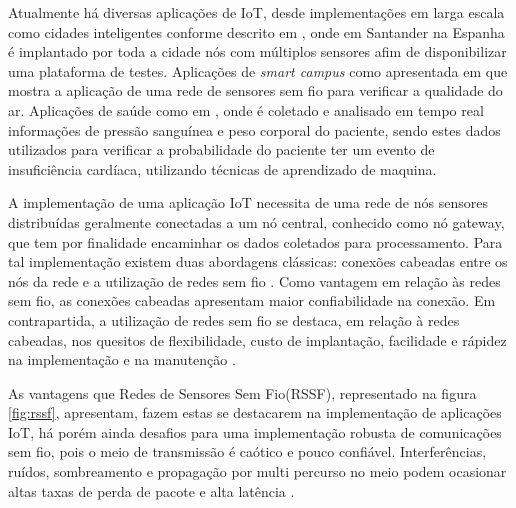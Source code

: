 Atualmente há diversas aplicações de IoT, desde implementações em larga escala como cidades inteligentes conforme descrito em \cite{sotres2017practical}, onde em Santander na Espanha é implantado por toda a cidade nós com múltiplos sensores afim de disponibilizar uma plataforma de testes. Aplicações de \emph{smart campus} como apresentada em \cite{wang2017performance} que mostra a aplicação de uma rede de sensores sem fio para verificar a qualidade do ar. Aplicações de saúde como em \cite{zhang2015remote}, onde é coletado e analisado em tempo real informações de pressão sanguínea e peso corporal do paciente, sendo estes dados utilizados para verificar a probabilidade do paciente ter um evento de insuficiência cardíaca, utilizando técnicas de aprendizado de maquina.


A implementação de uma aplicação IoT necessita de uma rede de nós sensores distribuídas geralmente conectadas a um nó central, conhecido como nó gateway, que tem por finalidade encaminhar os dados coletados para processamento. Para tal implementação existem duas abordagens clássicas: conexões cabeadas entre os nós da rede e a utilização de redes sem fio \cite{gomes2017estimaccao}. Como vantagem em relação às redes sem fio, as conexões cabeadas apresentam maior confiabilidade na conexão. Em contrapartida, a utilização de redes sem fio se destaca, em relação à redes cabeadas, nos quesitos de flexibilidade, custo de implantação, facilidade e rápidez na implementação e na manutenção \cite{gungor2009industrial}.

As vantagens que Redes de Sensores Sem Fio(RSSF), representado na figura \ref{fig:rssf}, apresentam, fazem estas se destacarem na implementação de aplicações IoT, há porém ainda desafios para uma implementação robusta de comunicações sem fio, pois o meio de transmissão é caótico e pouco confiável. Interferências, ruídos, sombreamento e propagação por multi percurso no meio podem ocasionar altas taxas de perda de pacote e alta latência \cite{gomes2017estimaccao}.

